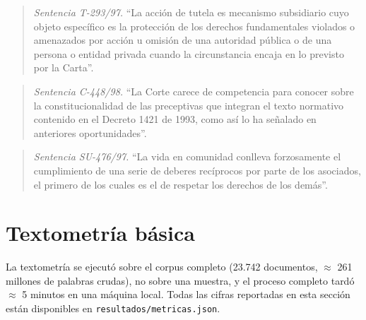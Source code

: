 \documentclass[11pt]{tg_usta}
\begin{document}
\begin{quote}\small
\textit{Sentencia T-293/97.} ``La acción de tutela es mecanismo subsidiario cuyo objeto específico es la protección de los derechos fundamentales violados o amenazados por acción u omisión de una autoridad pública o de una persona o entidad privada cuando la circunstancia encaja en lo previsto por la Carta''.
\end{quote}

\begin{quote}\small
\textit{Sentencia C-448/98.} ``La Corte carece de competencia para conocer sobre la constitucionalidad de las preceptivas que integran el texto normativo contenido en el Decreto 1421 de 1993, como así lo ha señalado en anteriores oportunidades''.
\end{quote}

\begin{quote}\small
\textit{Sentencia SU-476/97.} ``La vida en comunidad conlleva forzosamente el cumplimiento de una serie de deberes recíprocos por parte de los asociados, el primero de los cuales es el de respetar los derechos de los demás''.
\end{quote}

\section{Textometría básica}

La textometría se ejecutó sobre el corpus completo (23.742 documentos, $\approx$ 261 millones de palabras crudas), no sobre una muestra, y el proceso completo tardó $\approx$ 5 minutos en una máquina local. Todas las cifras reportadas en esta sección están disponibles en \texttt{resultados/metricas.json}.
\end{document}
